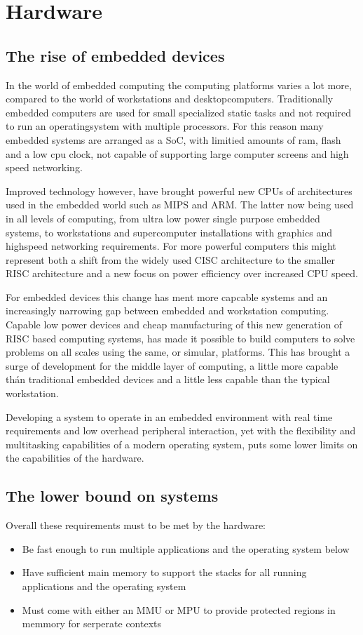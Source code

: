 \section{Hardware}
\subsection{The rise of embedded devices}
In the world of embedded computing the computing platforms varies a lot more,
compared to the world of workstations and desktopcomputers.
Traditionally embedded computers are used for small specialized static tasks and
not required to run an operatingsystem with multiple processors.
For this reason many embedded systems are arranged as a SoC,
with limitied amounts of ram, flash and a low cpu clock,
not capable of supporting large computer screens and high speed networking.

Improved technology however, have brought powerful new CPUs of architectures used in the embedded world
such as MIPS and ARM.
The latter now being used in all levels of computing, from ultra low power single purpose embedded systems,
to workstations and supercomputer installations with graphics and highspeed networking requirements.
For more powerful computers this might represent both a shift from the widely used CISC architecture
to the smaller RISC architecture and a new focus on power efficiency over increased CPU speed.

For embedded devices this change has ment more capcable systems
and an increasingly narrowing gap between embedded and workstation computing.
Capable low power devices and cheap manufacturing of this new generation of RISC based computing systems,
has made it possible to build computers to solve problems on all scales using the same, or simular, platforms.
This has brought a surge of development for the middle layer of computing,
a little more capable thán traditional embedded devices and a little less capable than the typical workstation.

Developing a system to operate in an embedded environment with real time requirements
and low overhead peripheral interaction,
yet with the flexibility and multitasking capabilities of a modern operating system,
puts some lower limits on the capabilities of the hardware.

\subsection{The lower bound on systems}
Overall these requirements must to be met by the hardware:
\begin{itemize}
	\item Be fast enough to run multiple applications and the operating system below
	\item Have sufficient main memory to support the stacks for all running applications and the operating system
	\item Must come with either an MMU or MPU to provide protected regions in memmory for serperate contexts
\end{itemize}

